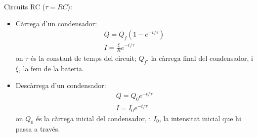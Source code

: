 \documentclass[../../../main.tex]{subfiles}
\begin{document}
\begin{multicols}{2}
\begin{enumerate}
\end{enumerate}
Circuits RC ($\tau=RC$):
\begin{itemize}
    \item Càrrega d'un condensador:
    \begin{gather*}
        Q=Q_f(1-e^{-t/\tau})\\
        I=\frac{\xi}{R}e^{-t/\tau}
    \end{gather*}
    {on $\tau$ és la constant de temps del circuit; $Q_f$, la càrrega final del condensador, i $\xi$, la fem de la bateria.}
    \item Descàrrega d'un condensador:
    \begin{gather*}
        Q=Q_0e^{-t/\tau}\\
        I=I_0e^{-t/\tau}
    \end{gather*}
    {on $Q_0$ és la càrrega inicial del condensador, i $I_0$, la intensitat inicial que hi passa a través.}\textbf{}
\end{itemize}

\end{multicols}
\end{document}
